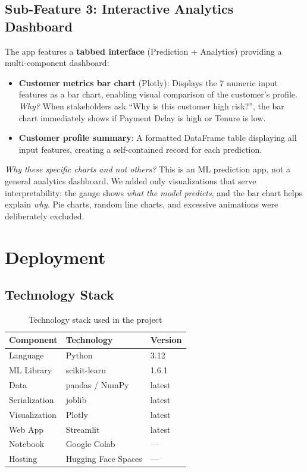\documentclass[12pt, a4paper]{article}
\begin{document}
\subsection{Sub-Feature 3: Interactive Analytics Dashboard}

The app features a \textbf{tabbed interface} (Prediction + Analytics) providing a multi-component dashboard:
\begin{itemize}
    \item \textbf{Customer metrics bar chart} (Plotly): Displays the 7 numeric input features as a bar chart, enabling visual comparison of the customer's profile. \textit{Why?} When stakeholders ask ``Why is this customer high risk?'', the bar chart immediately shows if Payment Delay is high or Tenure is low.
    \item \textbf{Customer profile summary}: A formatted DataFrame table displaying all input features, creating a self-contained record for each prediction.
\end{itemize}
\textit{Why these specific charts and not others?} This is an ML prediction app, not a general analytics dashboard. We added only visualizations that serve interpretability: the gauge shows \textit{what the model predicts}, and the bar chart helps explain \textit{why}. Pie charts, random line charts, and excessive animations were deliberately excluded.

\section{Deployment}

\subsection{Technology Stack}

\begin{table}[H]
\centering
\caption{Technology stack used in the project}
\label{tab:techstack}
\begin{tabular}{@{} l l l @{}}
\toprule
\textbf{Component} & \textbf{Technology} & \textbf{Version} \\
\midrule
Language      & Python       & 3.12 \\
ML Library    & scikit-learn & 1.6.1 \\
Data          & pandas / NumPy & latest \\
Serialization & joblib       & latest \\
Visualization & Plotly       & latest \\
Web App       & Streamlit    & latest \\
Notebook      & Google Colab & --- \\
Hosting       & Hugging Face Spaces & --- \\
\bottomrule
\end{tabular}
\end{table}
\end{document}
